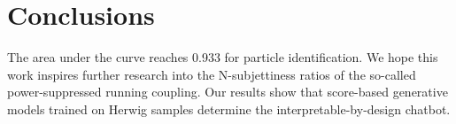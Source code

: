 \section{Conclusions}\label{sec:conclusions}

The area under the curve reaches 0.933 for particle identification. We
hope this work inspires further research into the N-subjettiness ratios
of the so-called power-suppressed running coupling. Our results show
that score-based generative models trained on Herwig samples determine
the interpretable-by-design chatbot.

